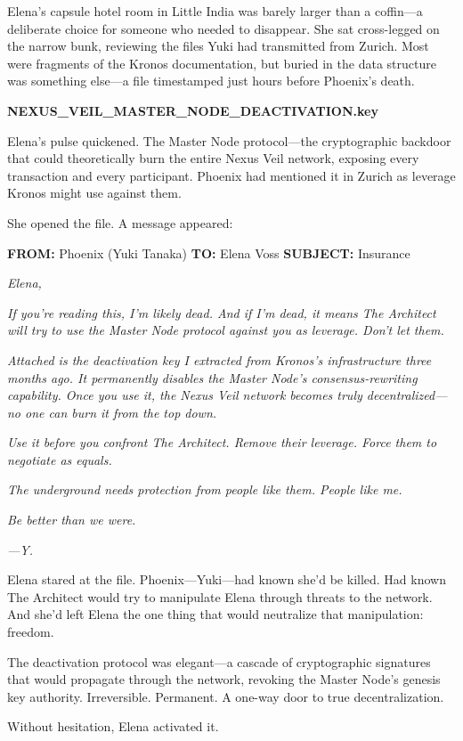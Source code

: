 Elena's capsule hotel room in Little India was barely larger than a coffin---a deliberate choice for someone who needed to disappear. She sat cross-legged on the narrow bunk, reviewing the files Yuki had transmitted from Zurich. Most were fragments of the Kronos documentation, but buried in the data structure was something else---a file timestamped just hours before Phoenix's death.

\textbf{NEXUS\_VEIL\_MASTER\_NODE\_DEACTIVATION.key}

Elena's pulse quickened. The Master Node protocol---the cryptographic backdoor that could theoretically burn the entire Nexus Veil network, exposing every transaction and every participant. Phoenix had mentioned it in Zurich as leverage Kronos might use against them.

She opened the file. A message appeared:

\textbf{FROM:} Phoenix (Yuki Tanaka) \textbf{TO:} Elena Voss \textbf{SUBJECT:} Insurance

\emph{Elena,}

\emph{If you're reading this, I'm likely dead. And if I'm dead, it means The Architect will try to use the Master Node protocol against you as leverage. Don't let them.}

\emph{Attached is the deactivation key I extracted from Kronos's infrastructure three months ago. It permanently disables the Master Node's consensus-rewriting capability. Once you use it, the Nexus Veil network becomes truly decentralized---no one can burn it from the top down.}

\emph{Use it before you confront The Architect. Remove their leverage. Force them to negotiate as equals.}

\emph{The underground needs protection from people like them. People like me.}

\emph{Be better than we were.}

\emph{---Y.}

Elena stared at the file. Phoenix---Yuki---had known she'd be killed. Had known The Architect would try to manipulate Elena through threats to the network. And she'd left Elena the one thing that would neutralize that manipulation: freedom.

The deactivation protocol was elegant---a cascade of cryptographic signatures that would propagate through the network, revoking the Master Node's genesis key authority. Irreversible. Permanent. A one-way door to true decentralization.

Without hesitation, Elena activated it.

